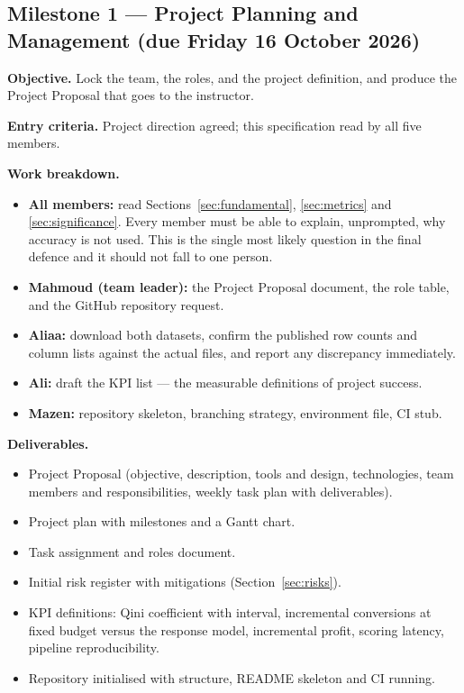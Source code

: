 \documentclass[11pt,a4paper]{article}
\begin{document}
\subsection{Milestone 1 --- Project Planning and Management (due Friday 16 October 2026)}

\textbf{Objective.} Lock the team, the roles, and the project definition, and produce the Project
Proposal that goes to the instructor.

\textbf{Entry criteria.} Project direction agreed; this specification read by all five members.

\textbf{Work breakdown.}
\begin{itemize}
\item \textbf{All members:} read Sections~\ref{sec:fundamental}, \ref{sec:metrics} and
\ref{sec:significance}. Every member must be able to explain, unprompted, why accuracy is not used.
This is the single most likely question in the final defence and it should not fall to one person.
\item \textbf{Mahmoud (team leader):} the Project Proposal document, the role table, and the GitHub repository
request.
\item \textbf{Aliaa:} download both datasets, confirm the published row counts and column lists
against the actual files, and report any discrepancy immediately.
\item \textbf{Ali:} draft the KPI list --- the measurable definitions of project success.
\item \textbf{Mazen:} repository skeleton, branching strategy, environment file, CI stub.
\end{itemize}

\textbf{Deliverables.}
\begin{itemize}
\item Project Proposal (objective, description, tools and design, technologies, team members and
responsibilities, weekly task plan with deliverables).
\item Project plan with milestones and a Gantt chart.
\item Task assignment and roles document.
\item Initial risk register with mitigations (Section~\ref{sec:risks}).
\item KPI definitions: Qini coefficient with interval, incremental conversions at fixed budget
versus the response model, incremental profit, scoring latency, pipeline reproducibility.
\item Repository initialised with structure, README skeleton and CI running.
\end{itemize}
\end{document}
